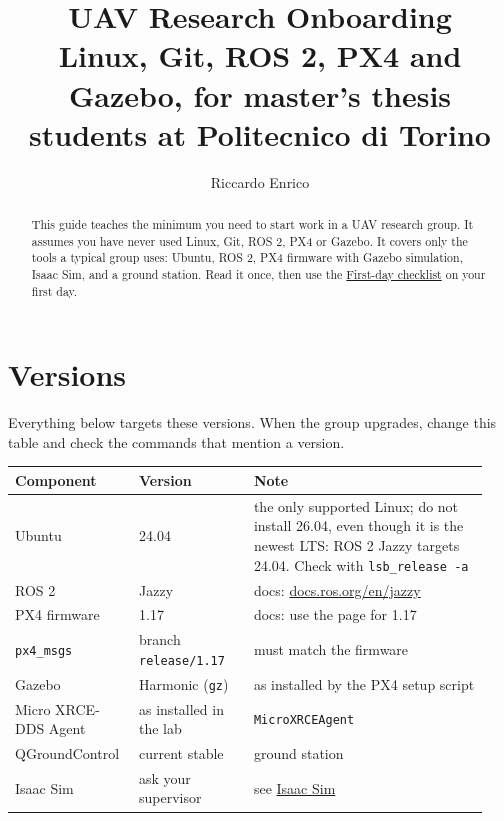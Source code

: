 \documentclass[11pt,a4paper]{article}
\title{UAV Research Onboarding\\[0.5ex]
  \large Linux, Git, ROS 2, PX4 and Gazebo, for master's thesis students at
  Politecnico di Torino}
\author{Riccardo Enrico}
\date{}
\begin{document}
\maketitle
\begin{abstract}
	This guide teaches the minimum you need to start work in a UAV research
	group. It assumes you have never used Linux, Git, ROS 2, PX4 or Gazebo.
	It covers only the tools a typical group uses: Ubuntu,
	ROS 2, PX4 firmware with Gazebo simulation, Isaac Sim, and a ground
	station. Read it once, then use the
	\hyperref[first-day-checklist]{First-day checklist} on your first day.
\end{abstract}

\tableofcontents

\section{Versions}\label{versions}

Everything below targets these versions. When the group upgrades, change
this table and check the commands that mention a version.

\begin{longtable}{@{}p{0.232\linewidth} p{0.232\linewidth} p{0.476\linewidth}@{}}
	\toprule
	Component            & Version                      & Note                                                 \\
	\midrule
	Ubuntu               & 24.04                        & the only supported Linux; do not install 26.04, even
	though it is the newest LTS: ROS 2 Jazzy targets 24.04. Check with
	\texttt{lsb\_release -a}                                                                                   \\
	ROS 2                & Jazzy                        & docs:
	\href{https://docs.ros.org/en/jazzy}{docs.ros.org/en/jazzy}                                                \\
	PX4 firmware         & 1.17                         & docs: use the page for 1.17                          \\
	\texttt{px4\_msgs}   & branch \texttt{release/1.17} & must match the
	firmware                                                                                                   \\
	Gazebo               & Harmonic (\texttt{gz})       & as installed by the PX4 setup
	script                                                                                                     \\
	Micro XRCE-DDS Agent & as installed in the lab      &
	\texttt{MicroXRCEAgent}                                                                                    \\
	QGroundControl       & current stable               & ground station                                       \\
	Isaac Sim            & ask your supervisor          & see \hyperref[isaac-sim]{Isaac Sim}                  \\
	\bottomrule
\end{longtable}
\end{document}
